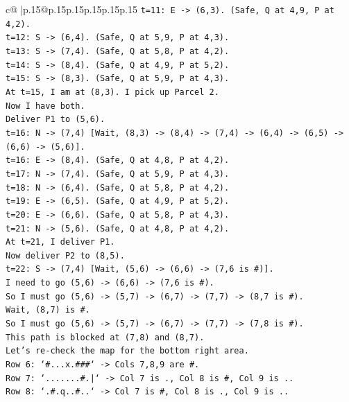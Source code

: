 \documentclass{article}
\begin{document}
{\begin{supertabular}{c@{$\;$}|p{.15\linewidth}@{}p{.15\linewidth}p{.15\linewidth}p{.15\linewidth}p{.15\linewidth}p{.15\linewidth}}
{{{\texttt{t=11: E {-}> (6,3). (Safe, Q at 4,9, P at 4,2).} \\
\texttt{t=12: S {-}> (6,4). (Safe, Q at 5,9, P at 4,3).} \\
\texttt{t=13: S {-}> (7,4). (Safe, Q at 5,8, P at 4,2).} \\
\texttt{t=14: S {-}> (8,4). (Safe, Q at 4,9, P at 5,2).} \\
\texttt{t=15: S {-}> (8,3). (Safe, Q at 5,9, P at 4,3).} \\
\texttt{At t=15, I am at (8,3). I pick up Parcel 2.} \\
\texttt{Now I have both.} \\
\texttt{Deliver P1 to (5,6).} \\
\texttt{t=16: N {-}> (7,4) {[}Wait, (8,3) {-}> (8,4) {-}> (7,4) {-}> (6,4) {-}> (6,5) {-}> (6,6) {-}> (5,6){]}.} \\
\texttt{t=16: E {-}> (8,4). (Safe, Q at 4,8, P at 4,2).} \\
\texttt{t=17: N {-}> (7,4). (Safe, Q at 5,9, P at 4,3).} \\
\texttt{t=18: N {-}> (6,4). (Safe, Q at 5,8, P at 4,2).} \\
\texttt{t=19: E {-}> (6,5). (Safe, Q at 4,9, P at 5,2).} \\
\texttt{t=20: E {-}> (6,6). (Safe, Q at 5,8, P at 4,3).} \\
\texttt{t=21: N {-}> (5,6). (Safe, Q at 4,8, P at 4,2).} \\
\texttt{At t=21, I deliver P1.} \\
\texttt{Now deliver P2 to (8,5).} \\
\texttt{t=22: S {-}> (7,4) {[}Wait, (5,6) {-}> (6,6) {-}> (7,6 is \#){]}.} \\
\texttt{I need to go (5,6) {-}> (6,6) {-}> (7,6 is \#).} \\
\texttt{So I must go (5,6) {-}> (5,7) {-}> (6,7) {-}> (7,7) {-}> (8,7 is \#).} \\
\texttt{Wait, (8,7) is \#.} \\
\texttt{So I must go (5,6) {-}> (5,7) {-}> (6,7) {-}> (7,7) {-}> (7,8 is \#).} \\
\texttt{This path is blocked at (7,8) and (8,7).} \\
\texttt{Let's re{-}check the map for the bottom right area.} \\
\texttt{Row 6: `\#...x.\#\#\#` {-}> Cols 7,8,9 are \#.} \\
\texttt{Row 7: `.......\#.|` {-}> Col 7 is ., Col 8 is \#, Col 9 is ..} \\
\texttt{Row 8: `.\#.q..\#..` {-}> Col 7 is \#, Col 8 is ., Col 9 is ..} \\
}}}
\end{supertabular}}
\end{document}
